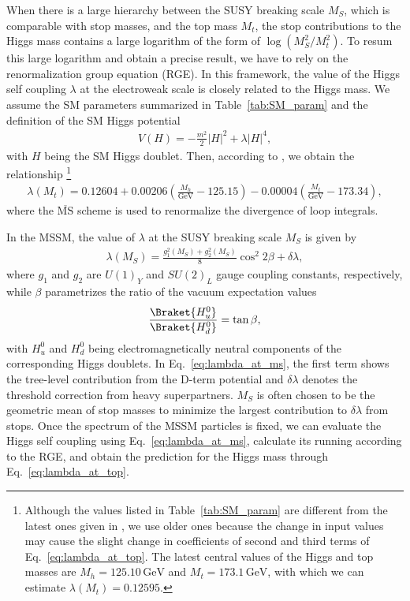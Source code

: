 \documentclass[12pt,twoside,book]{article}
\begin{document}
When there is a large hierarchy between the SUSY breaking scale $M_S$, which is comparable with stop masses, and the top mass $M_t$, the stop contributions to the Higgs mass contains a large logarithm of the form of $\log \left( M_S^2 / M_t^2 \right)$.
To resum this large logarithm and obtain a precise result, we have to rely on the renormalization group equation (RGE).
In this framework, the value of the Higgs self coupling $\lambda$ at the electroweak scale is closely related to the Higgs mass.
We assume the SM parameters summarized in Table~\ref{tab:SM_param} and the definition of the SM Higgs potential
\begin{align}
  V(H) = -\frac{m^2}{2} |H|^2 + \lambda |H|^4,
\end{align}
with $H$ being the SM Higgs doublet.
Then, according to \cite{Buttazzo:2013uya}, we obtain the relationship
\footnote{
  Although the values listed in Table~\ref{tab:SM_param} are different from the latest ones given in \cite{Tanabashi:2018oca}, we use older ones because the change in input values may cause the slight change in coefficients of second and third terms of Eq.~\eqref{eq:lambda_at_top}.
  The latest central values of the Higgs and top masses are $M_h = 125.10\,\mathrm{GeV}$ and $M_t = 173.1\,\mathrm{GeV}$, with which we can estimate $\lambda (M_t) = 0.12595$.
}
\begin{align}
  \lambda (M_t) = 0.12604
  + 0.00206 \left( \frac{M_h}{\mathrm{GeV}} - 125.15 \right)
  - 0.00004 \left( \frac{M_t}{\mathrm{GeV}} - 173.34 \right),
  \label{eq:lambda_at_top}
\end{align}
where the $\overline{\mathrm{MS}}$ scheme is used to renormalize the divergence of loop integrals.

In the MSSM, the value of $\lambda$ at the SUSY breaking scale $M_S$ is given by
\begin{align}
  \lambda (M_S) = \frac{g_1^2 (M_S) + g_2^2 (M_S)}{8} \cos^2 2\beta + \delta \lambda,
  \label{eq:lambda_at_ms}
\end{align}
where $g_1$ and $g_2$ are $U(1)_Y$ and $SU(2)_L$ gauge coupling constants, respectively, while $\beta$ parametrizes the ratio of the vacuum expectation values
\begin{align}
  \frac{\Braket{H_u^0}}{\Braket{H_d^0}} = \tan \beta,
\end{align}
with $H_u^0$ and $H_d^0$ being electromagnetically neutral components of the corresponding Higgs doublets.
In Eq.~\eqref{eq:lambda_at_ms}, the first term shows the tree-level contribution from the D-term potential and $\delta \lambda$ denotes the threshold correction from heavy superpartners.
$M_S$ is often chosen to be the geometric mean of stop masses to minimize the largest contribution to $\delta \lambda$ from stops.
Once the spectrum of the MSSM particles is fixed, we can evaluate the Higgs self coupling using Eq.~\eqref{eq:lambda_at_ms}, calculate its running according to the RGE, and obtain the prediction for the Higgs mass through Eq.~\eqref{eq:lambda_at_top}.
\end{document}
